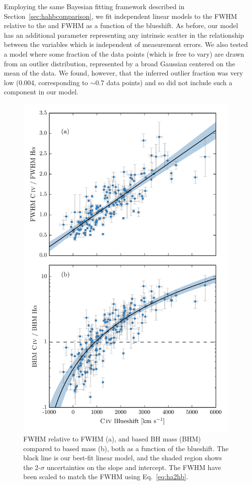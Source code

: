 Employing the same Bayesian fitting framework described in Section~\ref{sec:hahbcomparison}, we fit independent linear models to the  FWHM relative to the \ha and \hb FWHM as a function of the  blueshift. 
As before, our model has an additional parameter representing any intrinsic scatter in the relationship between the variables which is independent of measurement errors.  
We also tested a model where some fraction of the data points (which is free to vary) are drawn from an outlier distribution, represented by a broad Gaussian centered on the mean of the data. 
We found, however, that the inferred outlier fraction was very low (0.004, corresponding to $\sim$0.7 data points) and so did not include such a component in our model. 

\begin{figure}
    \includegraphics[width=\textwidth]{figures/chapter03/fwhm_and_bhm_ha.pdf} 
    \caption{ FWHM relative to \ha FWHM (a), and  based BH mass (BHM) compared to \ha based mass (b), both as a function of the  blueshift. The black line is our best-fit linear model, and the shaded region shows the 2-$\sigma$ uncertainties on the slope and intercept. The \ha FWHM have been scaled to match the \hb FWHM using Eq.~\ref{eq:ha2hb}.}  
    \label{fig:correction_ha}
\end{figure}

